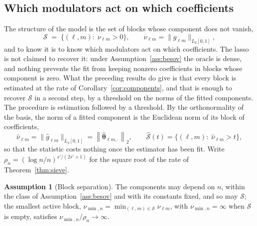 \documentclass[12pt]{article} %
\theoremstyle{definition}
\newtheorem{assumption}{Assumption}
\newcommand{\norm}[1]{\left\lVert #1 \right\rVert}
\newcommand{\cv}{\ell}
\newcommand{\md}{m}
\newcommand{\gcomp}[2]{g_{#1#2}}
\newcommand{\btheta}{\boldsymbol{\theta}}
\newcommand{\thetahat}{\widehat{\btheta}}
\newcommand{\seff}{s'}
\begin{document}
{\color{colR1}
\subsection{Which modulators act on which coefficients}
\label{sec:selection}

The structure of the model is the set of blocks whose component does not
vanish,
\[
  \mathcal{S} \;=\; \bigl\{(\cv,\md) :\; \nu_{\cv\md} > 0\bigr\},
  \qquad
  \nu_{\cv\md} = \bigl\lVert \gcomp{\cv}{\md} \bigr\rVert_{L_2[0,1]},
\]
and to know it is to know which modulators act on which coefficients. The
lasso is not claimed to recover it: under Assumption~\ref{ass:besov} the
oracle is dense, and nothing prevents the fit from keeping nonzero
coefficients in blocks whose component is zero. What the preceding results do give is that every block is
estimated at the rate of Corollary~\ref{cor:components}, and that is enough to
recover $\mathcal{S}$ in a second step, by a threshold on the norms of the fitted
components. The procedure is estimation followed by a threshold. By the
orthonormality of the basis, the norm of a fitted component is the Euclidean
norm of its block of coefficients,
\[
  \widehat{\nu}_{\cv\md}
  = \bigl\lVert \widehat{g}_{\cv\md} \bigr\rVert_{L_2[0,1]}
  = \norm{\thetahat_{\cv\md,\cdot}}_{2},
  \qquad
  \widehat{\mathcal{S}}(t) = \bigl\{(\cv,\md) :\; \widehat{\nu}_{\cv\md} > t\bigr\},
\]
so that the statistic costs nothing once the estimator has been fit. Write
$\rho_n = (\log n/n)^{\seff/(2\seff+1)}$ for the square root of the rate of
Theorem~\ref{thm:sieve}.

\begin{assumption}[Block separation]
\label{ass:sep}
The components may depend on $n$, within the class of
Assumption~\ref{ass:besov} and with its constants fixed, and so may $\mathcal{S}$; the
smallest active block, $\nu_{\min,n} = \min_{(\cv,\md)\in \mathcal{S}} \nu_{\cv\md}$, with
$\nu_{\min,n} = \infty$ when $\mathcal{S}$ is empty, satisfies $\nu_{\min,n}/\rho_n \to \infty$.
\end{assumption}

}
\end{document}
